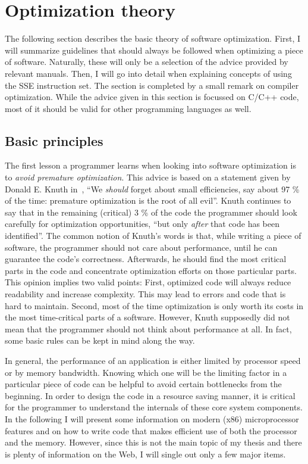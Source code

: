 \section{Optimization theory}
\label{Optimization_theory}
The following section describes the basic theory of software optimization. First, I will summarize guidelines that should always be followed when optimizing a piece of software. Naturally, these will only be a selection of the advice provided by relevant manuals. Then, I will go into detail when explaining concepts of using the SSE instruction set. The section is completed by a small remark on compiler optimization. While the advice given in this section is focussed on C/C++ code, most of it should be valid for other programming languages as well.

\subsection{Basic principles}
The first lesson a programmer learns when looking into software optimization is to \emph{avoid premature optimization}. This advice is based on a statement given by Donald E. Knuth in~\cite{knuth1974}, ``We \emph{should} forget about small efficiencies, say about 97 \% of the time: premature optimization is the root of all evil''. Knuth continues to say that in the remaining (critical) 3 \% of the code the programmer should look carefully for optimization opportunities, ``but only \emph{after} that code has been identified''. The common notion of Knuth's words is that, while writing a piece of software, the programmer should not care about performance, until he can guarantee the code's correctness. Afterwards, he should find the most critical parts in the code and concentrate optimization efforts on those particular parts. This opinion implies two valid points: First, optimized code will always reduce readability and increase complexity. This may lead to errors and code that is hard to maintain. Second, most of the time optimization is only worth its costs in the most time-critical parts of a software. However, Knuth supposedly did not mean that the programmer should not think about performance at all. In fact, some basic rules can be kept in mind along the way. 

In general, the performance of an application is either limited by processor speed or by memory bandwidth. Knowing which one will be the limiting factor in a particular piece of code can be helpful to avoid certain bottlenecks from the beginning. In order to design the code in a resource saving manner, it is critical for the programmer to understand the internals of these core system components. In the following I will present some information on modern (x86) microprocessor features and on how to write code that makes efficient use of both the processor and the memory. However, since this is not the main topic of my thesis and there is plenty of information on the Web, I will single out only a few major items.

